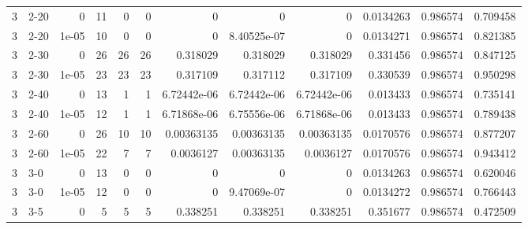 \begin{tabular}{rlrrrrrrrrrr}
     3 & 2-20   &      0     &          11 &                 0 &                 0 &     0           &     0           &      0           &        0.0134263 &               0.986574 &           0.709458 \\
     3 & 2-20   &      1e-05 &          10 &                 0 &                 0 &     0           &     8.40525e-07 &      0           &        0.0134271 &               0.986574 &           0.821385 \\
     3 & 2-30   &      0     &          26 &                26 &                26 &     0.318029    &     0.318029    &      0.318029    &        0.331456  &               0.986574 &           0.847125 \\
     3 & 2-30   &      1e-05 &          23 &                23 &                23 &     0.317109    &     0.317112    &      0.317109    &        0.330539  &               0.986574 &           0.950298 \\
     3 & 2-40   &      0     &          13 &                 1 &                 1 &     6.72442e-06 &     6.72442e-06 &      6.72442e-06 &        0.013433  &               0.986574 &           0.735141 \\
     3 & 2-40   &      1e-05 &          12 &                 1 &                 1 &     6.71868e-06 &     6.75556e-06 &      6.71868e-06 &        0.013433  &               0.986574 &           0.789438 \\
     3 & 2-60   &      0     &          26 &                10 &                10 &     0.00363135  &     0.00363135  &      0.00363135  &        0.0170576 &               0.986574 &           0.877207 \\
     3 & 2-60   &      1e-05 &          22 &                 7 &                 7 &     0.0036127   &     0.00363135  &      0.0036127   &        0.0170576 &               0.986574 &           0.943412 \\
     3 & 3-0    &      0     &          13 &                 0 &                 0 &     0           &     0           &      0           &        0.0134263 &               0.986574 &           0.620046 \\
     3 & 3-0    &      1e-05 &          12 &                 0 &                 0 &     0           &     9.47069e-07 &      0           &        0.0134272 &               0.986574 &           0.766443 \\
     3 & 3-5    &      0     &           5 &                 5 &                 5 &     0.338251    &     0.338251    &      0.338251    &        0.351677  &               0.986574 &           0.472509 \\

\end{tabular}
